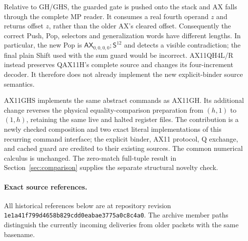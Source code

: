 Relative to GH/GHS, the guarded gate is pushed onto the stack and AX
falls through the complete MP reader. It consumes a real fourth operand
$z$ and returns offset $z$, rather than the older AX's cleared offset.
Consequently the correct Push, Pop, selectors and generalization words
have different lengths. In particular, the new Pop is
$\mathsf{AX}_{0,0,0,0};\mathsf S^{12}$ and detects a visible contradiction;
the final plain Shift used with the sum guard would be incorrect.
AX11QH4L/R instead preserves QAX11H's complete source and changes its
four-increment decoder. It therefore does not already implement the
new explicit-binder source semantics.

AX11GHS implements the same abstract commands as AX11GH. Its additional
change reverses the physical equality-comparison preparation from
$(h,1)$ to $(1,h)$, retaining the same live and halted register files.
The contribution is a newly checked composition and two exact literal
implementations of this recurring command interface; the explicit
binder, AX11 protocol, Q exchange, and cached guard are credited to
their existing sources. The common numerical calculus is unchanged.
The zero-match full-tuple result in Section~\ref{sec:comparison} supplies
the separate structural novelty check.

\paragraph{Exact source references.}
All historical references below are at repository revision
\texttt{1e1a41f799\allowbreak d4658b829c\allowbreak dd0eabae37\allowbreak 75a0c8c4a0}.
The archive member paths distinguish the currently incoming deliveries
from older packets with the same basename.

